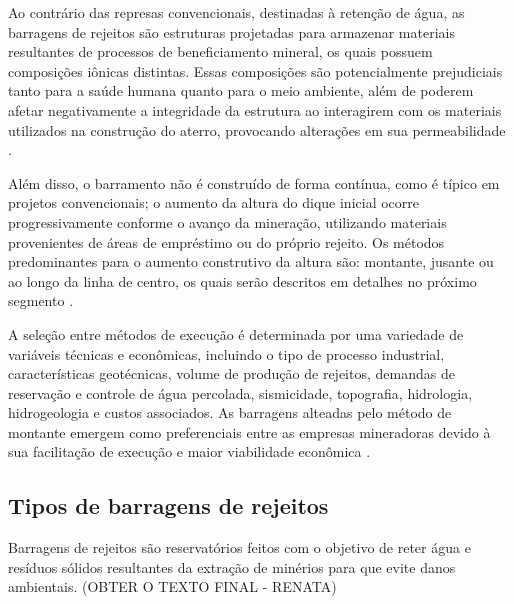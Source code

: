 Ao contrário das represas convencionais, destinadas à retenção de água,
as barragens de rejeitos são estruturas projetadas para armazenar
materiais resultantes de processos de beneficiamento mineral, os quais
possuem composições iônicas distintas. Essas composições são
potencialmente prejudiciais tanto para a saúde humana quanto para o meio
ambiente, além de poderem afetar negativamente a integridade da
estrutura ao interagirem com os materiais utilizados na construção do
aterro, provocando alterações em sua permeabilidade \cite{cardozo2017metodos}.

Além disso, o barramento não é construído de forma contínua, como é
típico em projetos convencionais; o aumento da altura do dique inicial
ocorre progressivamente conforme o avanço da mineração, utilizando
materiais provenientes de áreas de empréstimo ou do próprio rejeito. Os
métodos predominantes para o aumento construtivo da altura são:
montante, jusante ou ao longo da linha de centro, os quais serão
descritos em detalhes no próximo segmento \cite[p.12]{ibram2016gestao}.

A seleção entre métodos de execução é determinada por uma variedade de
variáveis técnicas e econômicas, incluindo o tipo de processo
industrial, características geotécnicas, volume de produção de rejeitos,
demandas de reservação e controle de água percolada, sismicidade,
topografia, hidrologia, hidrogeologia e custos associados. As barragens
alteadas pelo método de montante emergem como preferenciais entre as
empresas mineradoras devido à sua facilitação de execução e maior
viabilidade econômica \cite[p.17]{ibram2016gestao}.

\subsection{Tipos de barragens de rejeitos}
\label{subsec:tipos_barragens}

Barragens de rejeitos são reservatórios feitos com o objetivo de reter
água e resíduos sólidos resultantes da extração de minérios para que
evite danos ambientais. (OBTER O TEXTO FINAL - RENATA)

